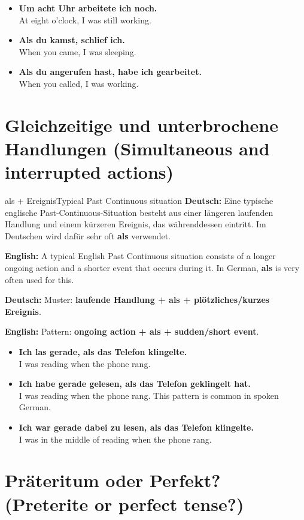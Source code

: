 \documentclass[a4paper,11pt]{article}
\newcommand{\GermanText}[1]{\textbf{Deutsch: }#1\par}
\newcommand{\EnglishText}[1]{{\small\color{SoftGray}\textbf{English: }#1\par}}
\newcommand{\ExampleItem}[2]{\item \textbf{#1}\\{\small\color{SoftGray}#2}}
\begin{document}
        \begin{exbox}
            \begin{itemize}
                \ExampleItem{Um acht Uhr arbeitete ich noch.}{At eight o'clock, I was still working.}
                \ExampleItem{Als du kamst, schlief ich.}{When you came, I was sleeping.}
                \ExampleItem{Als du angerufen hast, habe ich gearbeitet.}{When you called, I was working.}
            \end{itemize}
        \end{exbox}

\section{Gleichzeitige und unterbrochene Handlungen \textnormal{(Simultaneous and interrupted actions)}}

        \begin{grammarentry}{als + Ereignis}{Typical Past Continuous situation}
            \GermanText{Eine typische englische Past-Continuous-Situation besteht aus einer längeren laufenden Handlung und einem kürzeren Ereignis, das währenddessen eintritt. Im Deutschen wird dafür sehr oft \textbf{als} verwendet.}
            \EnglishText{A typical English Past Continuous situation consists of a longer ongoing action and a shorter event that occurs during it. In German, \textbf{als} is very often used for this.}

            \GermanText{Muster: \textbf{laufende Handlung + als + plötzliches/kurzes Ereignis}.}
            \EnglishText{Pattern: \textbf{ongoing action + als + sudden/short event}.}
        \end{grammarentry}

        \begin{exbox}
            \begin{itemize}
                \ExampleItem{Ich las gerade, als das Telefon klingelte.}{I was reading when the phone rang.}
                \ExampleItem{Ich habe gerade gelesen, als das Telefon geklingelt hat.}{I was reading when the phone rang. This pattern is common in spoken German.}
                \ExampleItem{Ich war gerade dabei zu lesen, als das Telefon klingelte.}{I was in the middle of reading when the phone rang.}
            \end{itemize}
        \end{exbox}

\section{Präteritum oder Perfekt? \textnormal{(Preterite or perfect tense?)}}
\end{document}
